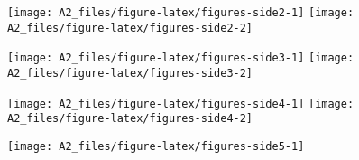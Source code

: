 \documentclass[
]{article}
\begin{document}
\texttt{[image: A2\_files/figure-latex/figures-side2-1]}
\texttt{[image: A2\_files/figure-latex/figures-side2-2]}

\texttt{[image: A2\_files/figure-latex/figures-side3-1]}
\texttt{[image: A2\_files/figure-latex/figures-side3-2]}

\texttt{[image: A2\_files/figure-latex/figures-side4-1]}
\texttt{[image: A2\_files/figure-latex/figures-side4-2]}

\texttt{[image: A2\_files/figure-latex/figures-side5-1]}
\end{document}
